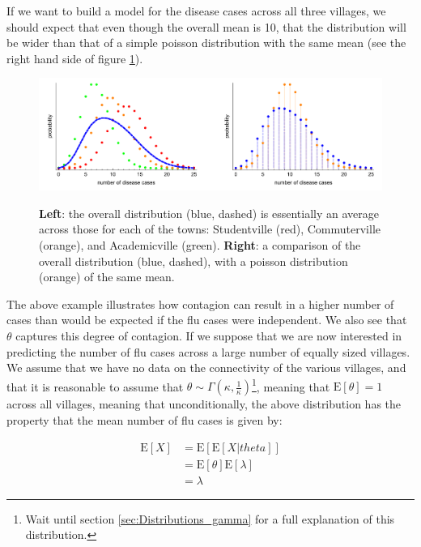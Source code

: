 \documentclass[11pt,fullpage]{book}
\begin{document}
If we want to build a model for the disease cases across all three villages, we should expect that even though the overall mean is 10, that the distribution will be wider than that of a simple poisson distribution with the same mean (see the right hand side of figure \ref{fig:Distributions_negativeBinomialDispersion}).

\begin{figure}
\centering
\scalebox{0.5} 
{\includegraphics{Distributions_negativeBinomialDispersion.pdf}}
\caption{\textbf{Left}: the overall distribution (blue, dashed) is essentially an average across those for each of the towns: Studentville (red), Commuterville (orange), and Academicville (green). \textbf{Right}: a comparison of the overall distribution (blue, dashed), with a poisson distribution (orange) of the same mean. }\label{fig:Distributions_negativeBinomialDispersion}
\end{figure}


The above example illustrates how contagion can result in a higher number of cases than would be expected if the flu cases were independent. We also see that $\theta$ captures this degree of contagion. If we suppose that we are now interested in predicting the number of flu cases across a large number of equally sized villages. We assume that we have no data on the connectivity of the various villages, and that it is reasonable to assume that $\theta\sim\Gamma(\kappa,\frac{1}{\kappa})$\footnote{Wait until section \ref{sec:Distributions_gamma} for a full explanation of this distribution.}, meaning that $\mathrm{E}[\theta] = 1$ across all villages, meaning that unconditionally, the above distribution has the property that the mean number of flu cases is given by:

\begin{equation}
\begin{align}
\mathrm{E}[X] &= \mathrm{E}\left[\mathrm{E}[X|theta]\right]\\
&= \mathrm{E}[\theta]\mathrm{E}[\lambda]\\
&= \lambda
\end{align}
\end{equation}
\end{document}

